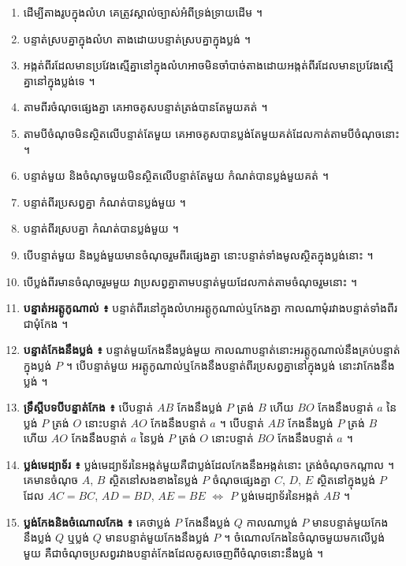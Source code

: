 \begin{note}[មេរៀនសង្ខេប]
\begin{enumerate}[1]
  \item ដើម្បីតាងរូបក្នុងលំហ គេត្រូវស្គាល់ច្បាស់អំពីទ្រង់ទ្រាយដើម ។
  \item បន្ទាត់ស្របគ្នាក្នុងលំហ តាងដោយបន្ទាត់ស្របគ្នាក្នុងប្លង់ ។
  \item អង្កត់ពីរដែលមានប្រវែងស្មើគ្នានៅក្នុងលំហអាចមិនចាំបាច់តាងដោយអង្កត់ពីរដែលមានប្រវែងស្មើគ្នានៅក្នុងប្លង់ទេ ។
  \item តាមពីរចំណុចផ្សេងគ្នា គេអាចគូសបន្ទាត់ត្រង់បានតែមួយគត់ ។
  \item តាមបីចំណុចមិនស្ថិតលើបន្ទាត់តែមួយ គេអាចគូសបានប្លង់តែមួយគត់ដែលកាត់តាមបីចំណុចនោះ ។
  \item បន្ទាត់មួយ និងចំណុចមួយមិនស្ថិតលើបន្ទាត់តែមួយ កំណត់បានប្លង់មួយគត់ ។
  \item បន្ទាត់ពីរប្រសព្វគ្នា កំណត់បានប្លង់មួយ ។
  \item បន្ទាត់ពីរស្របគ្នា កំណត់បានប្លង់មួយ ។
  \item បើបន្ទាត់មួយ និងប្លង់មួយមានចំណុចរួមពីរផ្សេងគ្នា នោះបន្ទាត់ទាំងមូលស្ថិតក្នុងប្លង់នោះ ។
  \item បើប្លង់ពីរមានចំណុចរួមមួយ វាប្រសព្វគ្នាតាមបន្ទាត់មួយដែលកាត់តាមចំណុចរួមនោះ ។
  \item \textbf{បន្ទាត់អរត្តូកូណាល់ ៖} បន្ទាត់ពីរនៅក្នុងលំហអរត្តូកូណាល់ឬកែងគ្នា កាលណាមុំរវាងបន្ទាត់ទាំងពីរជាមុំកែង ។
  \item \textbf{បន្ទាត់កែងនឹងប្លង់ ៖} បន្ទាត់មួយកែងនឹងប្លង់មួយ កាលណាបន្ទាត់នោះអរត្តូកូណាល់នឹងគ្រប់បន្ទាត់ក្នុងប្លង់ $P$ ។ បើបន្ទាត់មួយ អរត្តូកូណាល់ឬកែងនឹងបន្ទាត់ពីរប្រសព្វគ្នានៅក្នុងប្លង់ នោះវាកែងនឹងប្លង់ ។
  \item \textbf{ទ្រឹស្ដីបទបីបន្ទាត់កែង ៖} បើបន្ទាត់ $AB$ កែងនឹងប្លង់ $P$ ត្រង់ $B$ ហើយ $BO$ កែងនឹងបន្ទាត់ $a$ នៃប្លង់ $P$ ត្រង់ $O$ នោះបន្ទាត់ $AO$ កែងនឹងបន្ទាត់ $a$ ។ បើបន្ទាត់ $AB$ កែងនឹងប្លង់ $P$ ត្រង់ $B$ ហើយ $AO$ កែងនឹងបន្ទាត់ $a$ នៃប្លង់ $P$ ត្រង់ $O$ នោះបន្ទាត់ $BO$ កែងនឹងបន្ទាត់ $a$ ។
  \item \textbf{ប្លង់មេដ្យាទ័រ ៖} ប្លង់មេដ្យាទ័រនៃអង្កត់មួយគឺជាប្លង់ដែលកែងនឹងអង្កត់នោះ ត្រង់ចំណុចកណ្ដាល ។ គេមានចំណុច $A$, $B$ ស្ថិតនៅសងខាងនៃប្លង់ $P$ ចំណុចផ្សេងគ្នា $C$, $D$, $E$ ស្ថិតនៅក្នុងប្លង់ $P$ ដែល $AC = BC$, $AD = BD$, $AE = BE$ $\Leftrightarrow$ $P$ ប្លង់មេដ្យាទ័រនៃអង្កត់ $AB$ ។
  \item \textbf{ប្លង់កែងនិងចំណោលកែង ៖} គេថាប្លង់ $P$ កែងនឹងប្លង់ $Q$ កាលណាប្លង់ $P$ មានបន្ទាត់មួយកែងនឹងប្លង់ $Q$ ឬប្លង់ $Q$ មានបន្ទាត់មួយកែងនឹងប្លង់ $P$ ។ ចំណោលកែងនៃចំណុចមួយមកលើប្លង់មួយ គឺជាចំណុចប្រសព្វរវាងបន្ទាត់កែងដែលគូសចេញពីចំណុចនោះនឹងប្លង់ ។
\end{enumerate}
\end{note}

